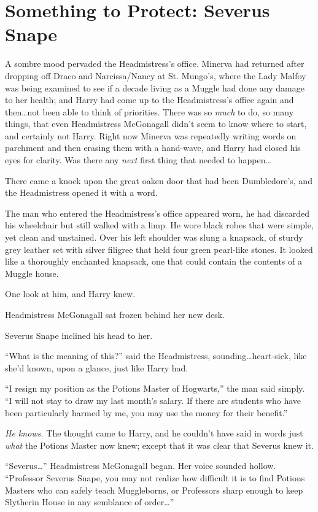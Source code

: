 \chapter{Something to Protect: Severus Snape}

\lettrine{A}{} sombre mood pervaded the Headmistress’s office. Minerva had returned after dropping off Draco and Narcissa/Nancy at St. Mungo’s, where the Lady Malfoy was being examined to see if a decade living as a Muggle had done any damage to her health; and Harry had come up to the Headmistress’s office again and then…not been able to think of priorities. There was so \emph{much} to do, so many things, that even Headmistress McGonagall didn’t seem to know where to start, and certainly not Harry. Right now Minerva was repeatedly writing words on parchment and then erasing them with a hand-wave, and Harry had closed his eyes for clarity. Was there any \emph{next} first thing that needed to happen…

There came a knock upon the great oaken door that had been Dumbledore’s, and the Headmistress opened it with a word.

The man who entered the Headmistress’s office appeared worn, he had discarded his wheelchair but still walked with a limp. He wore black robes that were simple, yet clean and unstained. Over his left shoulder was slung a knapsack, of sturdy grey leather set with silver filigree that held four green pearl-like stones. It looked like a thoroughly enchanted knapsack, one that could contain the contents of a Muggle house.

One look at him, and Harry knew.

Headmistress McGonagall sat frozen behind her new desk.

Severus Snape inclined his head to her.

“What is the meaning of this?” said the Headmistress, sounding…heart-sick, like she’d known, upon a glance, just like Harry had.

“I resign my position as the Potions Master of Hogwarts,” the man said simply. “I will not stay to draw my last month’s salary. If there are students who have been particularly harmed by me, you may use the money for their benefit.”

\emph{He knows.} The thought came to Harry, and he couldn’t have said in words just \emph{what} the Potions Master now knew; except that it was clear that Severus knew it.

“Severus…” Headmistress McGonagall began. Her voice sounded hollow. “Professor Severus Snape, you may not realize how difficult it is to find Potions Masters who can safely teach Muggleborns, or Professors sharp enough to keep Slytherin House in any semblance of order…”

